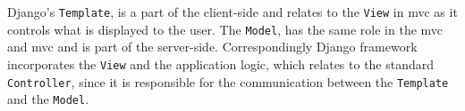 Django's {\tt Template}, is a part of the client-side 
and relates to the {\tt View} in {\sc mvc} as it controls what is 
displayed to the user. The {\tt Model}, has the same role in the 
{\sc mvc} and {\sc mvc} and is part of the server-side.  
Correspondingly Django framework incorporates the {\tt View} and the 
application logic, which relates to the standard {\tt Controller}, 
since it is responsible for the communication between the 
{\tt Template} and the {\tt Model}. 



